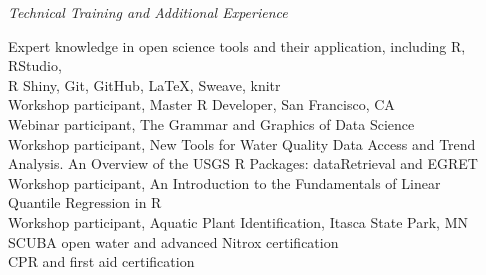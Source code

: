 \documentclass[letterpaper,12pt]{article}
\newcommand{\sectitle}[1]{\vspace{\baselineskip} \centerline{\large{\textit{#1}}}}
\begin{document}
\sectitle{Technical Training and Additional Experience}

Expert knowledge in open science tools and their application, including R, RStudio, \\
\hspace{0.3in}R Shiny, Git, GitHub, \LaTeX, Sweave, knitr \\
Workshop participant, Master R Developer, San Francisco, CA \\
Webinar participant, The Grammar and Graphics of Data Science \\
Workshop participant, New Tools for Water Quality Data Access and Trend \\ \hspace{0.3in} Analysis. An Overview of the USGS R Packages: dataRetrieval and EGRET\\
Workshop participant, An Introduction to the Fundamentals of Linear \\
\hspace{0.3in}Quantile Regression in R \\
Workshop participant, Aquatic Plant Identification, Itasca State Park, MN \\
SCUBA open water and advanced Nitrox certification \\
CPR and first aid certification
\end{document}
